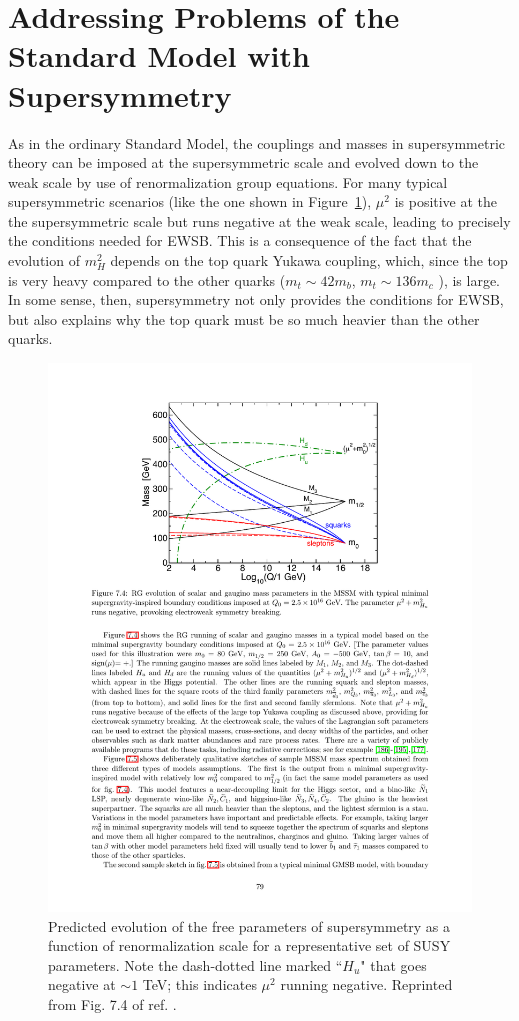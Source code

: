 \documentclass[dissertation.tex]{subfiles}
\begin{document}
\section{Addressing Problems of the Standard Model with Supersymmetry}
\label{sec:Addressing Problems of the Standard Model with Supersymmetry}

As in the ordinary Standard Model, the couplings and masses in supersymmetric theory can be imposed at the supersymmetric scale and evolved down to the weak scale by use of renormalization group equations.  For many typical supersymmetric scenarios (like the one shown in Figure~\ref{fig:SUSY_RG_evolution}), $\mu^{2}$ is positive at the the supersymmetric scale but runs negative at the weak scale, leading to precisely the conditions needed for EWSB.  This is a consequence of the fact that the evolution of $m_{H}^{2}$ depends on the top quark Yukawa coupling, which, since the top is very heavy compared to the other quarks ($m_{t}\sim42m_{b}$, $m_{t}\sim136m_{c}$ \cite{PDG}), is large.  In some sense, then, supersymmetry not only provides the conditions for EWSB, but also explains why the top quark must be so much heavier than the other quarks.

\begin{figure}
	\centering
	\includegraphics[scale=1.0]{SUSY_RG_evolution}
	\caption{Predicted evolution of the free parameters of supersymmetry as a function of renormalization scale for a representative set of SUSY parameters.  Note the dash-dotted line marked ``$H_{u}$" that goes negative at $\sim1$ TeV; this indicates $\mu^{2}$ running negative.  Reprinted from Fig. 7.4 of ref. \cite{SUSY_primer}.}
	\label{fig:SUSY_RG_evolution}
\end{figure}
\end{document}

